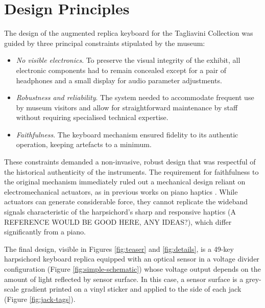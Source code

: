 \section{Design Principles}\label{design}


The design of the augmented replica keyboard for the Tagliavini Collection was guided by three principal constraints stipulated by the museum:
\begin{itemize}
\item \emph{No visible electronics}. To preserve the visual integrity of the exhibit, all electronic components had to remain concealed except for a pair of headphones and a small display for audio parameter adjustments.
\item \emph{Robustness and reliability}. The system needed to accommodate frequent use by museum visitors and allow for straightforward maintenance by staff without requiring specialised technical expertise.
\item \emph{Faithfulness}. The keyboard mechanism ensured fidelity to its authentic operation, keeping artefacts to a minimum. 
\end{itemize}
These constraints demanded a non-invasive, robust design that was respectful of the historical authenticity of the instruments. The requirement for faithfulness to the original mechanism immediately ruled out a mechanical design reliant on electromechanical actuators, as in previous works on piano haptics \cite{Timmermans2020,Gillespie1996}. While actuators can generate considerable force, they cannot replicate the wideband signals characteristic of the harpsichord's sharp and responsive haptics (A REFERENCE WOULD BE GOOD HERE, ANY IDEAS?), which differ significantly from a piano.




The final design, visible in Figures \ref{fig:teaser} and \ref{fig:details}, is a 49-key harpsichord keyboard replica equipped with an optical sensor in a voltage divider configuration (Figure \ref{fig:simple-schematic}) whose voltage output depends on the amount of light reflected by sensor surface. In this case, a sensor surface is a grey-scale gradient printed on a vinyl sticker and applied to the side of each jack (Figure \ref{fig:jack-tags}). 



